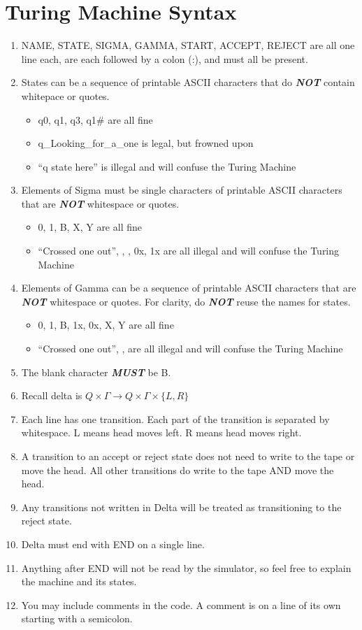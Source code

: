 \documentclass[12pt]{article}
\title{}
\begin{document}
\section*{Turing Machine Syntax}

\begin{enumerate}[1]
\item NAME, STATE, SIGMA, GAMMA, START, ACCEPT, REJECT are all one line each, are each followed by a colon (:), and must all be present.
\item States can be a sequence of printable ASCII characters that do \emph{\textbf{NOT}} contain whitepace or quotes.
\begin{itemize}
\item q0, q1, q3, q1\# are all fine
\item q\_Looking\_for\_a\_one is legal, but frowned upon
\item ``q state here'' is illegal and will confuse the Turing Machine
\end{itemize}
\item Elements of Sigma must be single characters of printable ASCII characters that are \emph{\textbf{NOT}} whitespace or quotes.
\begin{itemize}
\item 0, 1, B, X, Y are all fine
\item ``Crossed one out'', , , 0x, 1x are all illegal and will confuse the Turing Machine
\end{itemize}
\item Elements of Gamma can be a sequence of printable ASCII characters that are \emph{\textbf{NOT}} whitespace or quotes. For clarity, do \emph{\textbf{NOT}} reuse the names for states.
\begin{itemize}
\item 0, 1, B, 1x, 0x, X, Y are all fine
\item ``Crossed one out'', ,  are all illegal and will confuse the Turing Machine
\end{itemize}
\item The blank character \emph{\textbf{MUST}} be B.
\item Recall delta is $Q\times\Gamma\rightarrow Q\times\Gamma\times\{L, R\}$
\item Each line has one transition. Each part of the transition is separated by whitespace. L means head moves left. R means head moves right.
\item A transition to an accept or reject state does not need to write to the tape or move the head. All other transitions do write to the tape AND move the head.
\item Any transitions not written in Delta will be treated as transitioning to the reject state.
\item Delta must end with END on a single line.
\item Anything after END will not be read by the simulator, so feel free to explain the machine and its states.
\item You may include comments in the code. A comment is on a line of its
own starting with a semicolon.
\end{enumerate}
\end{document}
